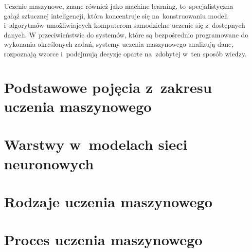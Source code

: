 Uczenie maszynowe, znane również jako machine learning, to~specjalistyczna gałąź sztucznej inteligencji,
która koncentruje się na~konstruowaniu modeli i~algorytmów umożliwiajcych komputerom samodzielne uczenie się z~dostępnych danych.
W przeciwieństwie do systemów, które są bezpośrednio programowane do wykonania określonych zadań,
systemy uczenia maszynowego analizują dane, rozpoznają wzorce i~podejmują decyzje oparte na~zdobytej w~ten sposób wiedzy.

\section{Podstawowe pojęcia z~zakresu uczenia maszynowego}


\section{Warstwy w~modelach sieci neuronowych}


\section{Rodzaje uczenia maszynowego}


\section{Proces uczenia maszynowego}
